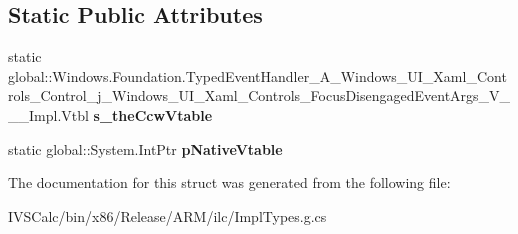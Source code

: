 \subsection*{Static Public Attributes}
\begin{DoxyCompactItemize}
\item 
\mbox{\label{struct_windows_1_1_foundation_1_1_typed_event_handler___a___windows___u_i___xaml___controls___cof52bacf1f8ce9dc6f9ea3c7dd11a16ef_a93ed3958698b52d2a25785e0558da896}} 
static global\+::\+Windows.\+Foundation.\+Typed\+Event\+Handler\+\_\+\+A\+\_\+\+Windows\+\_\+\+U\+I\+\_\+\+Xaml\+\_\+\+Controls\+\_\+\+Control\+\_\+j\+\_\+\+Windows\+\_\+\+U\+I\+\_\+\+Xaml\+\_\+\+Controls\+\_\+\+Focus\+Disengaged\+Event\+Args\+\_\+\+V\+\_\+\+\_\+\+\_\+\+Impl.\+Vtbl {\bfseries s\+\_\+the\+Ccw\+Vtable}
\item 
\mbox{\label{struct_windows_1_1_foundation_1_1_typed_event_handler___a___windows___u_i___xaml___controls___cof52bacf1f8ce9dc6f9ea3c7dd11a16ef_a727d4a564a0c7767236b5493d164b3f0}} 
static global\+::\+System.\+Int\+Ptr {\bfseries p\+Native\+Vtable}
\end{DoxyCompactItemize}


The documentation for this struct was generated from the following file\+:\begin{DoxyCompactItemize}
\item 
I\+V\+S\+Calc/bin/x86/\+Release/\+A\+R\+M/ilc/Impl\+Types.\+g.\+cs\end{DoxyCompactItemize}

